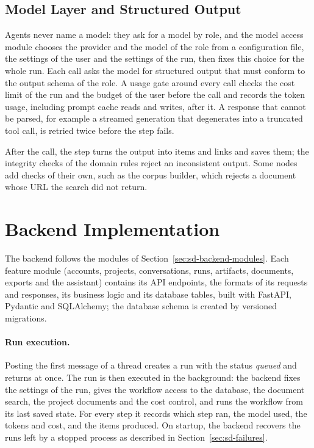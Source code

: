 \subsection{Model Layer and Structured Output}
\label{sec:impl-llm}

Agents never name a model: they ask for a model by role, and the model access module chooses the provider and the model of the role from a configuration file, the settings of the user and the settings of the run, then fixes this choice for the whole run. Each call asks the model for structured output that must conform to the output schema of the role. A usage gate around every call checks the cost limit of the run and the budget of the user before the call and records the token usage, including prompt cache reads and writes, after it. A response that cannot be parsed, for example a streamed generation that degenerates into a truncated tool call, is retried twice before the step fails.

After the call, the step turns the output into items and links and saves them; the integrity checks of the domain rules reject an inconsistent output. Some nodes add checks of their own, such as the corpus builder, which rejects a document whose URL the search did not return.

\section{Backend Implementation}
\label{sec:impl-backend}

The backend follows the modules of Section~\ref{sec:sd-backend-modules}. Each feature module (accounts, projects, conversations, runs, artifacts, documents, exports and the assistant) contains its API endpoints, the formats of its requests and responses, its business logic and its database tables, built with FastAPI, Pydantic and SQLAlchemy; the database schema is created by versioned migrations.

\paragraph{Run execution.} Posting the first message of a thread creates a run with the status \emph{queued} and returns at once. The run is then executed in the background: the backend fixes the settings of the run, gives the workflow access to the database, the document search, the project documents and the cost control, and runs the workflow from its last saved state. For every step it records which step ran, the model used, the tokens and cost, and the items produced. On startup, the backend recovers the runs left by a stopped process as described in Section~\ref{sec:sd-failures}.

